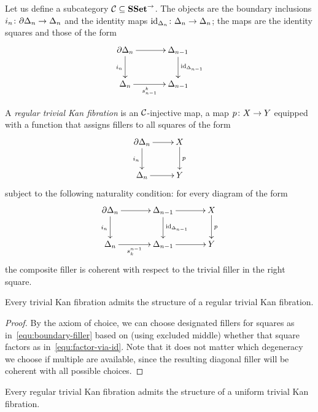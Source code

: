 \documentclass[reqno,10pt,a4paper,oneside]{amsart}
\begin{document}
\medskip
 
Let us define a subcategory $\cal{C} \subseteq \SSet^\to$. The objects are the boundary inclusions
$i_n \co \partial \Delta_n \to \Delta_n$ and the identity maps $\id_{\Delta_n} \co \Delta_n \to \Delta_n$; the
maps are the identity squares and those of the form
 \[
\xymatrix@C=1.2cm{
  \partial \Delta_n
  \ar[r]
  \ar[d]_{i_n}
&
  \Delta_{n-1}
  \ar[d]^{\id_{\Delta_{n-1}}}
\\
  \Delta_n
  \ar[r]_-{s^k_{n-1}}
&
  \Delta_{n-1}
}
\] 


\begin{definition} A \emph{regular trivial Kan fibration} is an $\cal{C}$-injective map, \ie a map $p \co X \to Y$ 
equipped with a function that assigns fillers to all squares of the form
\begin{equation}
\label{equ:boundary-filler}
\xycenter{
\partial \Delta_n \ar[d]_{i_n} \ar[r] & X \ar[d]^{p} \\
\Delta_n \ar[r] & Y } 
\end{equation}
subject to the following naturality condition: for every diagram of the form
\begin{equation}
\label{equ:factor-via-id}
{\vcenter{\hbox{\xymatrix@C=1.2cm{
  \partial \Delta_n
  \ar[r]
  \ar[d]_{i_n}
&
  \Delta_{n-1}
  \ar[r]
  \ar[d]^{\id_{\Delta_{n-1}}}
&
  X
  \ar[d]^{p}
\\
  \Delta_n
  \ar[r]_-{s_k^{n-1}}
&
  \Delta_{n-1}
  \ar[r]
&
  Y
}}}}
\end{equation}
the composite filler is coherent with respect to the trivial filler in the right square. 
\end{definition}


\begin{lemma}[ZFC] \label{triv-Kan-is-regular}
Every trivial Kan fibration admits the structure of a regular trivial Kan fibration.
\end{lemma}

\begin{proof} By the axiom of choice, we can choose  designated fillers for squares as in~\eqref{equ:boundary-filler}
 based on (using excluded middle) whether that square factors as in~\eqref{equ:factor-via-id}. Note that it does not matter which degeneracy we choose if multiple are available, since the resulting diagonal filler will be coherent with 
 all possible choices.
\end{proof} 


\begin{lemma} \label{reg-triv-is-unif-Kan}
Every regular trivial Kan fibration admits the structure of a uniform trivial Kan fibration.
\end{lemma}
\end{document}
